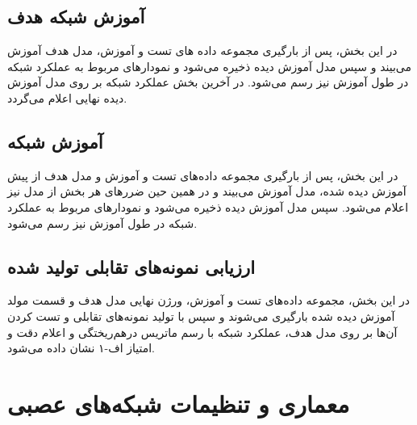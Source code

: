 \subsection{آموزش شبکه هدف}
در این بخش، پس از بارگیری مجموعه داده های تست و آموزش، مدل هدف آموزش می‌بیند و سپس مدل آموزش دیده ذخیره می‌شود و نمودارهای مربوط به عملکرد شبکه در طول آموزش نیز رسم می‌شود. در آخرین بخش عملکرد شبکه بر روی مدل آموزش دیده نهایی اعلام می‌گردد.
\begin{latin}
\end{latin}

\subsection{آموزش شبکه
}
در این بخش، پس از بارگیری مجموعه داده‌های تست و آموزش و مدل هدف از پیش آموزش دیده شده‌، مدل 
آموزش می‌بیند و در همین حین ضرر‌های هر بخش از مدل نیز اعلام می‌شود. سپس مدل آموزش دیده ذخیره می‌شود و نمودارهای مربوط به عملکرد شبکه در طول آموزش نیز رسم می‌شود.
\begin{latin}
\end{latin}

\subsection{ارزیابی نمونه‌های تقابلی تولید شده}
در این بخش، مجموعه داده‌های تست و آموزش، ورژن نهایی مدل هدف و قسمت مولد 
آموزش دیده شده بارگیری می‌شوند و سپس با تولید نمونه‌های تقابلی و تست کردن آن‌ها بر روی مدل هدف، عملکرد شبکه با رسم ماتریس درهم‌ریختگی
و اعلام دقت 
و امتیاز اف-۱ 
نشان داده می‌شود.
\begin{latin}
\end{latin}

\section{معماری و تنظیمات شبکه‌های عصبی}
